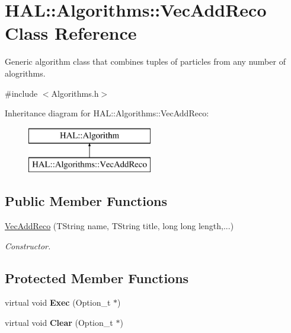 \hypertarget{class_h_a_l_1_1_algorithms_1_1_vec_add_reco}{\section{H\-A\-L\-:\-:Algorithms\-:\-:Vec\-Add\-Reco Class Reference}
\label{class_h_a_l_1_1_algorithms_1_1_vec_add_reco}
}


Generic algorithm class that combines tuples of particles from any number of alogrithms.  




{\ttfamily \#include $<$Algorithms.\-h$>$}

Inheritance diagram for H\-A\-L\-:\-:Algorithms\-:\-:Vec\-Add\-Reco\-:\begin{figure}[H]
\begin{center}
\leavevmode
\includegraphics[height=2.000000cm]{class_h_a_l_1_1_algorithms_1_1_vec_add_reco}
\end{center}
\end{figure}
\subsection*{Public Member Functions}
\begin{DoxyCompactItemize}
\item 
\hyperlink{class_h_a_l_1_1_algorithms_1_1_vec_add_reco_a50faa627aa37f90ac35eccb3f24fb851}{Vec\-Add\-Reco} (T\-String name, T\-String title, long long length,...)
\begin{DoxyCompactList}\small\item\em Constructor. \end{DoxyCompactList}\end{DoxyCompactItemize}
\subsection*{Protected Member Functions}
\begin{DoxyCompactItemize}
\item 
\hypertarget{class_h_a_l_1_1_algorithms_1_1_vec_add_reco_a63f7458fec37ae553418b15a375dafa0}{virtual void {\bfseries Exec} (Option\-\_\-t $\ast$)}\label{class_h_a_l_1_1_algorithms_1_1_vec_add_reco_a63f7458fec37ae553418b15a375dafa0}

\item 
\hypertarget{class_h_a_l_1_1_algorithms_1_1_vec_add_reco_afcf9f83e8165c1cbd7a193ab8f9c8445}{virtual void {\bfseries Clear} (Option\-\_\-t $\ast$)}\label{class_h_a_l_1_1_algorithms_1_1_vec_add_reco_afcf9f83e8165c1cbd7a193ab8f9c8445}

\end{DoxyCompactItemize}
